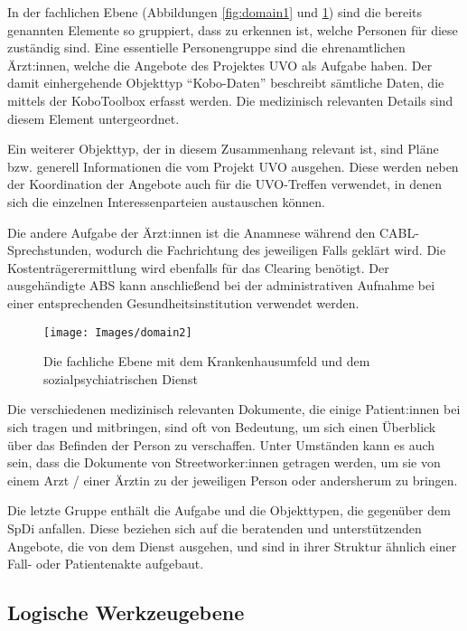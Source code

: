 In der fachlichen Ebene (Abbildungen \ref{fig:domain1} und \ref{fig:domain2}) sind die bereits genannten Elemente so gruppiert, dass zu erkennen ist, welche Personen für diese zuständig sind. Eine essentielle Personengruppe sind die ehrenamtlichen Ärzt:innen, welche die Angebote des Projektes \ac{UVO} als Aufgabe haben. Der damit einhergehende Objekttyp \enquote{Kobo-Daten} beschreibt sämtliche Daten, die mittels der KoboToolbox erfasst werden. Die medizinisch relevanten Details sind diesem Element untergeordnet.

Ein weiterer Objekttyp, der in diesem Zusammenhang relevant ist, sind Pläne bzw. generell Informationen die vom Projekt \ac{UVO} ausgehen. Diese werden neben der Koordination der Angebote auch für die UVO-Treffen verwendet, in denen sich die einzelnen Interessenparteien austauschen können.

Die andere Aufgabe der Ärzt:innen ist die Anamnese während den CABL-Sprechstunden, wodurch die Fachrichtung des jeweiligen Falls geklärt wird. Die Kostenträgerermittlung wird ebenfalls für das Clearing benötigt. Der ausgehändigte \ac{ABS} kann anschließend bei der administrativen Aufnahme bei einer entsprechenden Gesundheitsinstitution verwendet werden.

\begin{figure}[h]
	\centering
	\texttt{[image: Images/domain2]}
	\caption[Fachliche Ebene - Teil 2]{Die fachliche Ebene mit dem Krankenhausumfeld und dem sozialpsychiatrischen Dienst}
	\label{fig:domain2}
\end{figure}

Die verschiedenen medizinisch relevanten Dokumente, die einige Patient:innen bei sich tragen und mitbringen, sind oft von Bedeutung, um sich einen Überblick über das Befinden der Person zu verschaffen. Unter Umständen kann es auch sein, dass die Dokumente von Streetworker:innen getragen werden, um sie von einem Arzt / einer Ärztin zu der jeweiligen Person oder andersherum zu bringen.

Die letzte Gruppe enthält die Aufgabe und die Objekttypen, die gegenüber dem \ac{SpDi} anfallen. Diese beziehen sich auf die beratenden und unterstützenden Angebote, die von dem Dienst ausgehen, und sind in ihrer Struktur ähnlich einer Fall- oder Patientenakte aufgebaut.

\subsection{Logische Werkzeugebene}

